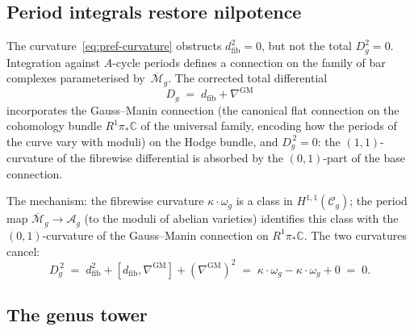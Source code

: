 \documentclass[11pt]{report}
\theoremstyle{definition}
\theoremstyle{remark}
\numberwithin{equation}{section}
\begin{document}
\subsection*{Period integrals restore nilpotence}

The curvature~\eqref{eq:pref-curvature} obstructs
$d_{\mathrm{fib}}^2=0$, but not the total $D_g^2=0$.
Integration against $A$-cycle periods defines a connection on the
family of bar complexes parameterised by~$\overline{\mathcal M}_g$.
The corrected total differential
\[
D_g\;=\;d_{\mathrm{fib}}+\nabla^{\mathrm{GM}}
\]
incorporates the Gauss--Manin connection (the canonical flat
connection on the cohomology bundle $R^1\pi_*\mathbb C$ of
the universal family, encoding how the periods of the curve vary
with moduli) on the Hodge bundle, and
$D_g^{\,2}=0$: the $(1,1)$-curvature of the fibrewise differential
is absorbed by the $(0,1)$-part of the base connection.

The mechanism: the fibrewise curvature $\kappa\cdot\omega_g$ is a
class in $H^{1,1}(\mathcal C_g)$; the period map
$\overline{\mathcal M}_g\to\mathcal A_g$ (to the moduli of abelian
varieties) identifies this class with the $(0,1)$-curvature of the
Gauss--Manin connection on $R^1\pi_*\mathbb C$. The two
curvatures cancel:
\[
D_g^{\,2}
\;=\;
d_{\mathrm{fib}}^2
+[d_{\mathrm{fib}},\nabla^{\mathrm{GM}}]
+(\nabla^{\mathrm{GM}})^2
\;=\;
\kappa\cdot\omega_g-\kappa\cdot\omega_g+0
\;=\;0.
\]

\subsection*{The genus tower}
\end{document}

